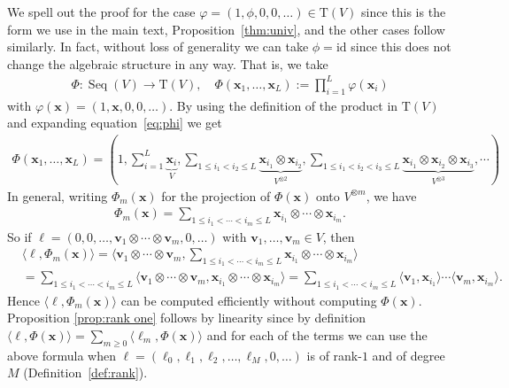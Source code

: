 \documentclass{article} \usepackage{iclr2021_conference,times}
\def\eqref#1{equation~\ref{#1}}
\newcommand{\bx}{\mathbf{x}}
\newcommand{\bv}{\mathbf{v}}
\newcommand{\T}[1]{\mathrm{T}({#1})}
\newcommand{\Seq}[1]{\operatorname{Seq}(#1)}
\theoremstyle{plain}
\theoremstyle{definition}
\begin{document}
We spell out the proof for the case $ \varphi=(1,\phi, 0,0,\dots) \in \T{V}$ since this is the form we use in the main text, Proposition~\ref{thm:univ}, and the other cases follow similarly.  
In fact, without loss of generality we can take $ \phi = \mathrm{id} $ since this does not change the algebraic structure in any way.
That is, we take 
	\begin{align} \label{eq:phi}
	\Phi:\Seq{V}\to \T{V}, \quad \Phi(\bx_1, \ldots, \bx_L) := \prod_{i=1}^L \varphi(\bx_i)
	\end{align}
  with $\varphi(\bx)=(1,\bx,0,0,\ldots)$.
By using the definition of the product in $\T{V}$ and expanding \eqref{eq:phi} we get  
	\begin{align}
	\Phi(\bx_1, \ldots, \bx_L) = (1, \sum_{i=1}^L \underbrace{\bx_i}_{V}, \sum_{1 \leq i_1 < i_2 \leq L} \underbrace{\bx_{i_1}\otimes \bx_{i_2}}_{V^{\otimes 2}}, \sum_{1 \leq i_1 < i_2 < i_3 \leq L} \underbrace{\bx_{i_1}\otimes \bx_{i_2}\otimes \bx_{i_3}}_{V^{\otimes 3}}, \cdots) 
	\end{align}
	In general, writing $ \Phi_m(\bx) $ for the projection of $ \Phi(\bx) $ onto $ V^{\otimes m} $, we have
	\begin{align} \label{eq:phim}
	\Phi_m(\bx) = \sum_{1 \le i_1 < \cdots < i_m \le L} \bx_{i_1} \otimes \cdots \otimes \bx_{i_m}.
	\end{align}
	So if $ \ell =(0,0,\ldots, \bv_1 \otimes \cdots \otimes \bv_m,0,\ldots) $ with $\bv_1,\ldots,\bv_m \in V$, then 
	\begin{align}
	&\langle \ell, \Phi_m(\bx) \rangle 
	= \langle \bv_1 \otimes \cdots \otimes \bv_m, \sum_{1 \le i_1 < \cdots < i_m \le L} \bx_{i_1} \otimes \cdots \otimes \bx_{i_m} \rangle \\
	&= \sum_{1 \le i_1 < \cdots < i_m \le L} \langle \bv_1 \otimes \cdots \otimes \bv_m, \bx_{i_1} \otimes \cdots \otimes \bx_{i_m} \rangle
	= \sum_{1 \le i_1 < \cdots < i_m \le L} \langle \bv_1 , \bx_{i_1} \rangle \cdots \langle \bv_m, \bx_{i_m} \rangle.
	\end{align}
	Hence $ \langle \ell, \Phi_m(\bx) \rangle $ can be computed efficiently without computing $ \Phi(\bx) $.
  Proposition \ref{prop:rank one} follows by linearity since by definition $\langle \ell, \Phi(\bx) \rangle = \sum_{m  \ge 0} \langle \ell_m, \Phi(\bx) \rangle$ and for each of the terms we can use the above formula when $\ell=(\ell_0,\ell_1,\ell_2,\ldots,\ell_M,0,\ldots)$ is of rank-$1$ and of degree $M$ (Definition~\ref{def:rank}).
\end{document}
